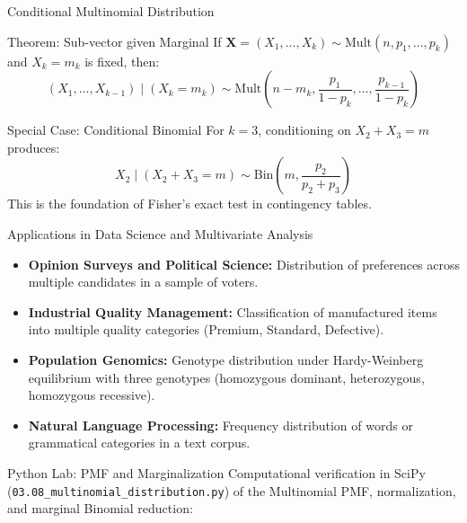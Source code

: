 \documentclass[aspectratio=169,xcolor={dvipsnames,table}]{beamer}
\begin{document}
\begin{frame}{Conditional Multinomial Distribution}
	\vspace{-0.15cm}
	\begin{block}{Theorem: Sub-vector given Marginal}
		\scriptsize
		If $\bm{X} = (X_{1}, \dots, X_{k}) \sim \text{Mult}(n, p_{1}, \dots, p_{k})$ and $X_{k} = m_{k}$ is fixed, then:
		$$(X_{1}, \dots, X_{k-1}) \mid (X_{k} = m_{k}) \sim \text{Mult}\left(n - m_{k}, \dfrac{p_{1}}{1 - p_{k}}, \dots, \dfrac{p_{k-1}}{1 - p_{k}}\right)$$
	\end{block}
	\vspace{0.05cm}
	\pause
	\begin{alertblock}{Special Case: Conditional Binomial}
		\scriptsize
		For $k = 3$, conditioning on $X_{2} + X_{3} = m$ produces:
		$$X_{2} \mid (X_{2} + X_{3} = m) \sim \text{Bin}\left(m, \dfrac{p_{2}}{p_{2} + p_{3}}\right)$$
		This is the foundation of Fisher's exact test in contingency tables.
	\end{alertblock}
\end{frame}

\begin{frame}{Applications in Data Science and Multivariate Analysis}
	\vspace{-0.1cm}
	\begin{itemize}\itemsep=0.1cm
		\item \textbf{Opinion Surveys and Political Science:} Distribution of preferences across multiple candidates in a sample of voters. \pause
		\item \textbf{Industrial Quality Management:} Classification of manufactured items into multiple quality categories (Premium, Standard, Defective). \pause
		\item \textbf{Population Genomics:} Genotype distribution under Hardy-Weinberg equilibrium with three genotypes (homozygous dominant, heterozygous, homozygous recessive). \pause
		\item \textbf{Natural Language Processing:} Frequency distribution of words or grammatical categories in a text corpus.
	\end{itemize}
\end{frame}

\begin{frame}[fragile]{Python Lab: PMF and Marginalization}
	\vspace{-0.05cm}
	\scriptsize
	Computational verification in SciPy (\texttt{03.08\_multinomial\_distribution.py}) of the Multinomial PMF, normalization, and marginal Binomial reduction:
	\vspace{0.02cm}
	{
	}
\end{frame}
\end{document}
